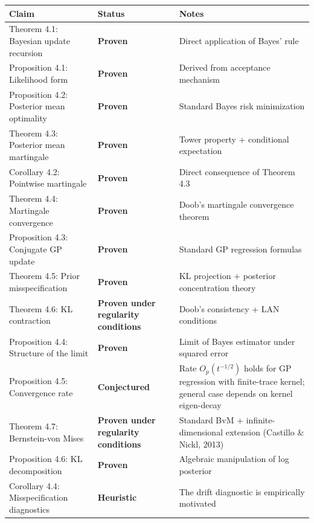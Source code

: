 \documentclass[
  12pt,
]{article}
\begin{document}
\begin{longtable}[]{@{}
  >{\raggedright\arraybackslash}p{}
  >{\raggedright\arraybackslash}p{}
  >{\raggedright\arraybackslash}p{}@{}}
\toprule\noalign{}
\begin{minipage}[b]{\linewidth}\raggedright
Claim
\end{minipage} & \begin{minipage}[b]{\linewidth}\raggedright
Status
\end{minipage} & \begin{minipage}[b]{\linewidth}\raggedright
Notes
\end{minipage} \\
\midrule\noalign{}
\endhead
\bottomrule\noalign{}
\endlastfoot
Theorem 4.1: Bayesian update recursion & \textbf{Proven} & Direct
application of Bayes' rule \\
Proposition 4.1: Likelihood form & \textbf{Proven} & Derived from
acceptance mechanism \\
Proposition 4.2: Posterior mean optimality & \textbf{Proven} & Standard
Bayes risk minimization \\
Theorem 4.3: Posterior mean martingale & \textbf{Proven} & Tower
property + conditional expectation \\
Corollary 4.2: Pointwise martingale & \textbf{Proven} & Direct
consequence of Theorem 4.3 \\
Theorem 4.4: Martingale convergence & \textbf{Proven} & Doob's
martingale convergence theorem \\
Proposition 4.3: Conjugate GP update & \textbf{Proven} & Standard GP
regression formulas \\
Theorem 4.5: Prior misspecification & \textbf{Proven} & KL projection +
posterior concentration theory \\
Theorem 4.6: KL contraction & \textbf{Proven under regularity
conditions} & Doob's consistency + LAN conditions \\
Proposition 4.4: Structure of the limit & \textbf{Proven} & Limit of
Bayes estimator under squared error \\
Proposition 4.5: Convergence rate & \textbf{Conjectured} & Rate
\(O_p(t^{-1/2})\) holds for GP regression with finite-trace kernel;
general case depends on kernel eigen-decay \\
Theorem 4.7: Bernstein-von Mises & \textbf{Proven under regularity
conditions} & Standard BvM + infinite-dimensional extension (Castillo \&
Nickl, 2013) \\
Proposition 4.6: KL decomposition & \textbf{Proven} & Algebraic
manipulation of log posterior \\
Corollary 4.4: Misspecification diagnostics & \textbf{Heuristic} & The
drift diagnostic is empirically motivated \\
\end{longtable}
\end{document}
